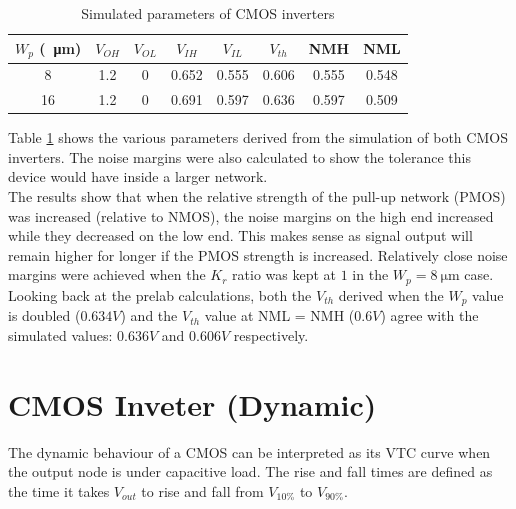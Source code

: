 \documentclass[CMPE]{../KGCOEReport}
\begin{document}
	 \pagebreak
	
	\begin{table}[h!]
		\renewcommand{\arraystretch}{1.3}
		\setlength{\tabcolsep}{12pt}
		\caption{Simulated parameters of CMOS inverters}
		\begin{center}
		    \begin{tabular}{|c|c|c|c|c|c|c|c|}\hline
		    $W_p$ (\SI{}{\micro\metre}) &
		     $V_{OH}$ & $V_{OL}$ & $V_{IH}$ & $V_{IL}$ & $V_{th}$ & NMH & NML \\\hline
		    8 & 1.2 & 0 & 0.652 & 0.555 & 0.606 & 0.555 & 0.548 \\\hline
		    16 & 1.2 & 0 & 0.691 & 0.597 & 0.636 & 0.597 & 0.509 \\\hline
		    \end{tabular}
		\end{center}
		\label{tab:cmos}
	\end{table}

	Table \ref{tab:cmos} shows the various parameters derived from the
	simulation of both CMOS inverters. The noise margins were also
	calculated to show the tolerance this device would have inside a
	larger network.\\

	The results show that when the relative strength of the pull-up network (PMOS)
	was increased (relative to NMOS), the noise margins on the high end increased
	while they decreased on the low end. This makes sense as signal output will
	remain higher for longer if the PMOS strength is increased. Relatively close noise
	margins were achieved when the $K_r$ ratio was kept at $1$ in the
	$W_p = \SI{8}{\micro\metre}$ case.\\

	Looking back at the prelab calculations, both the $V_{th}$ derived when the $W_p$
	value is doubled ($0.634V$) and the $V_{th}$ value at NML = NMH ($0.6V$) agree
	with the simulated values: $0.636V$ and $0.606V$ respectively.

	\section*{CMOS Inveter (Dynamic)}
	The dynamic behaviour of a CMOS can be interpreted as its VTC curve when
	the output node is under capacitive load. The rise and fall times are defined
	as the time it takes $V_{out}$ to rise and fall from $V_{10\%}$ to $V_{90\%}$.
	
	\pagebreak
\end{document}
